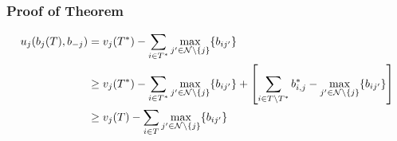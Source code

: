 \documentclass[aspectratio=1610,handout]{beamer}
\begin{document}
\begin{frame}
	\frametitle{Proof of Theorem}
	\begin{align*}
		u_j(b_j(T),b_{-j}) & = v_j(T^*)-\sum\limits_{i\in T^*}\max\limits_{j'\in\mathcal{N}\setminus \{j\}}\{b_{ij'}\}                                                                                                      \\
		                   & \geq v_j(T^*)-\sum\limits_{i\in T^*} \max\limits_{j'\in\mathcal{N}\setminus \{j\}}\{b_{ij'}\} + \left[\sum_{i\in T\setminus T^*}b_{i,j}^*-\max\limits_{j'\in\mathcal{N}\setminus \{j\}}\{b_{ij'}\} \right] \\
		                   & \geq v_j(T)-\sum\limits_{i\in T}\max\limits_{j'\in \mathcal{N}\setminus \{j\}}\{b_{ij'}\}
	\end{align*}
\end{frame}
\end{document}
